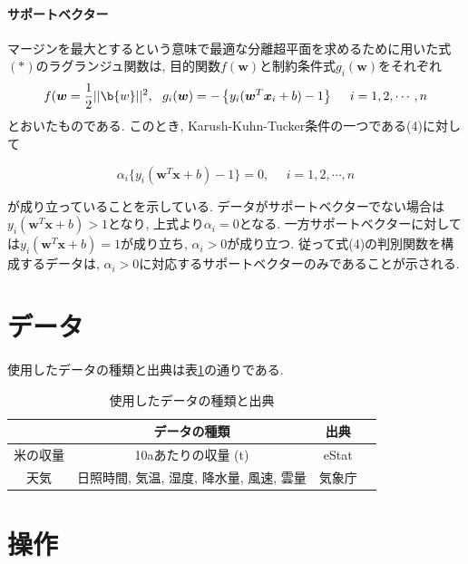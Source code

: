 \documentclass{jarticle}
\begin{document}
\paragraph{サポートベクター}

マージンを最大とするという意味で最適な分離超平面を求めるために用いた式$(*)$のラグランジュ関数は, 目的関数$f(\bm{w})$と制約条件式$g_i(\bm{w})$をそれぞれ
\[f(\bm{w} = \frac{1}{2}||\b{w}||^2,\ \ g_i(\bm{w}) = -\left\{ y_i (\bm{w}^T\bm{x}_i + b) - 1\right\}\ \ \ \ i=1,2,\cdots, n\]
とおいたものである.
このとき, Karush-Kuhn-Tucker条件の一つである(4)に対して

\[\alpha_i \{y_i (\bm{w}^T \bm{x} + b) - 1\} = 0,\ \ \ \ \ \ i=1,2,\cdots,n\]

が成り立っていることを示している. データがサポートベクターでない場合は$y_i(\bm{w}^T \bm{x} + b) >1$となり, 上式より$\alpha_i = 0$となる. 一方サポートベクターに対しては$y_i(\bm{w}^T \bm{x} + b) = 1$が成り立ち, $\alpha_i > 0$が成り立つ. 従って式(4)の判別関数を構成するデータは, $\alpha_i > 0$に対応するサポートベクターのみであることが示される.

\hypertarget{header-n2013}{%
\section{データ}\label{header-n2013}}
使用したデータの種類と出典は表\ref{data}の通りである.

\begin{table}[H]
\caption{使用したデータの種類と出典}
\begin{tabular}{|c|c|c|c|} \hline
&データの種類&出典\\ \hline
米の収量&10aあたりの収量 (t)&eStat\\ \hline
天気&日照時間, 気温, 湿度, 降水量, 風速, 雲量&気象庁\\ \hline
\end{tabular}
\centering
\label{data}
\end{table}


\hypertarget{header-n2026}{%
\section{操作}\label{header-n2026}}
\end{document}
